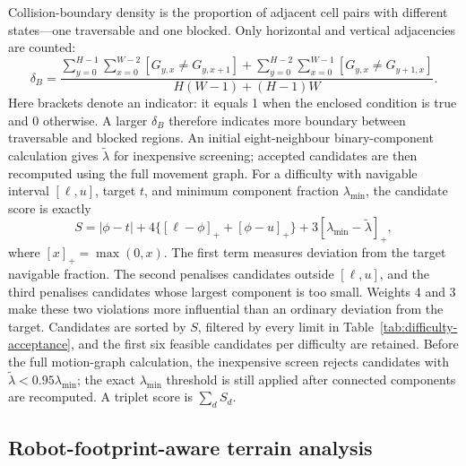 \documentclass[11pt]{article}
\begin{document}
Collision-boundary density is the proportion of adjacent cell pairs with
different states---one traversable and one blocked. Only horizontal and
vertical adjacencies are counted:
\begin{equation}
  \delta_B=\frac{
  \sum_{y=0}^{H-1}\sum_{x=0}^{W-2}[G_{y,x}\ne G_{y,x+1}]+
  \sum_{y=0}^{H-2}\sum_{x=0}^{W-1}[G_{y,x}\ne G_{y+1,x}]}
  {H(W-1)+(H-1)W}.
\end{equation}
Here brackets denote an indicator: it equals 1 when the enclosed condition is
true and 0 otherwise. A larger $\delta_B$ therefore indicates more boundary
between traversable and blocked regions. An initial eight-neighbour binary-component
calculation gives $\widetilde\lambda$ for inexpensive screening; accepted
candidates are then recomputed using the full movement graph. For a difficulty
with navigable interval $[\ell,u]$, target $t$, and minimum component fraction
$\lambda_{\min}$, the candidate score is exactly
\begin{equation}
  S=|\phi-t|+4\{[\ell-\phi]_+ +[\phi-u]_+\}
  +3[\lambda_{\min}-\widetilde\lambda]_+,
\end{equation}
where $[x]_+=\max(0,x)$. The first term measures deviation from the target
navigable fraction. The second penalises candidates outside $[\ell,u]$, and
the third penalises candidates whose largest component is too small. Weights 4
and 3 make these two violations more influential than an ordinary deviation
from the target. Candidates are sorted by $S$, filtered by every limit
in Table~\ref{tab:difficulty-acceptance}, and the first six feasible candidates
per difficulty are retained. Before the full motion-graph calculation, the
inexpensive screen rejects candidates with
$\widetilde\lambda<0.95\lambda_{\min}$; the exact $\lambda_{\min}$ threshold is
still applied after connected components are recomputed. A triplet score is
$\sum_d S_d$.

\subsection{Robot-footprint-aware terrain analysis}
\end{document}
